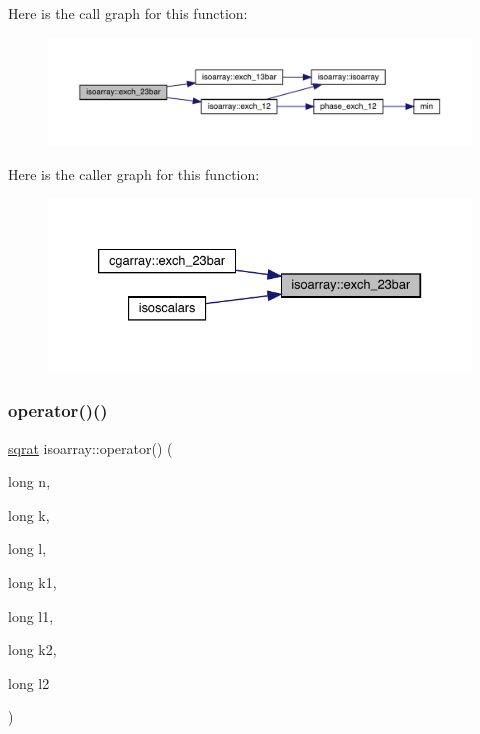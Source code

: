 Here is the call graph for this function\+:\nopagebreak
\begin{figure}[H]
\begin{center}
\leavevmode
\includegraphics[width=350pt]{d5/dd9/classisoarray_ac6b8d6c435627c589a5bfa9edfa7408d_cgraph}
\end{center}
\end{figure}
Here is the caller graph for this function\+:\nopagebreak
\begin{figure}[H]
\begin{center}
\leavevmode
\includegraphics[width=333pt]{d5/dd9/classisoarray_ac6b8d6c435627c589a5bfa9edfa7408d_icgraph}
\end{center}
\end{figure}
\mbox{\label{classisoarray_a07114d3b1b8f125d169f10f81884ce16}} 
\subsubsection{\texorpdfstring{operator()()}{operator()()}\hspace{0.1cm}{\footnotesize\ttfamily [1/2]}}
{\footnotesize\ttfamily \mbox{\hyperlink{classsqrat}{sqrat}} isoarray\+::operator() (\begin{DoxyParamCaption}\item[{long}]{n,  }\item[{long}]{k,  }\item[{long}]{l,  }\item[{long}]{k1,  }\item[{long}]{l1,  }\item[{long}]{k2,  }\item[{long}]{l2 }\end{DoxyParamCaption})}

